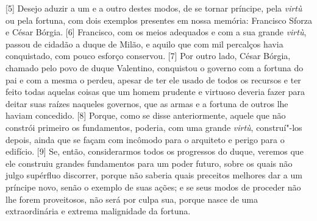 {[}5{]} Desejo aduzir a um e a outro destes modos, de se tornar
príncipe, pela \emph{virtù} ou pela fortuna, com dois exemplos presentes
em nossa memória: Francisco Sforza e César Bórgia. {[}6{]} Francisco,
com os meios adequados e com a sua grande \emph{virtù}, passou de
cidadão a duque de Milão, e aquilo que com mil percalços havia
conquistado, com pouco esforço conservou. {[}7{]} Por outro lado, César
Bórgia, chamado pelo povo de duque Valentino, conquistou o governo com a
fortuna do pai e com a mesma o perdeu, apesar de ter ele usado
de todos os recursos e ter feito todas aquelas coisas que um homem
prudente e virtuoso deveria fazer para deitar suas raízes naqueles
governos, que as armas e a fortuna de outros lhe haviam concedido.
{[}8{]} Porque, como se disse anteriormente, aquele que não constrói
primeiro os fundamentos, poderia, com uma grande \emph{virtù},
construí"-los depois, ainda que se façam com incômodo para o arquiteto e
perigo para o edifício. {[}9{]} Se, então, considerarmos todos os
progressos do duque, veremos que ele construiu grandes fundamentos para
um poder futuro, sobre os quais não julgo supérfluo discorrer, porque
não saberia quais preceitos melhores dar a um príncipe novo, senão o
exemplo de suas ações; e se seus modos de proceder não lhe forem
proveitosos, não será por culpa sua, porque nasce de uma extraordinária
e extrema malignidade da fortuna.

